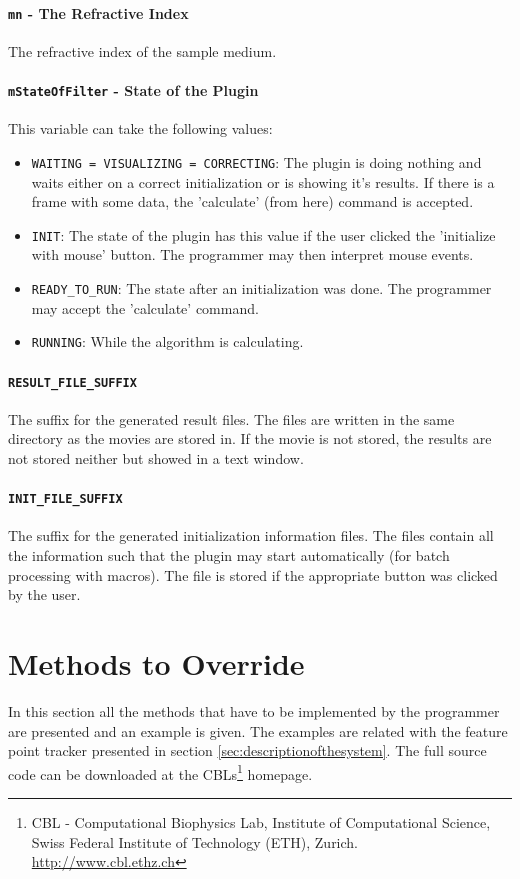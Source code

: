 \documentclass{scrartcl}
\begin{document}
\paragraph{\texttt{mn} - The Refractive Index} The refractive index of the sample medium.
\paragraph{\texttt{mStateOfFilter} - State of the Plugin} This variable can take the following values: 
\begin{itemize}
	\item \texttt{WAITING = VISUALIZING = CORRECTING}: The plugin is doing nothing and waits either on a correct initialization or is showing it's results. If there is a frame with some data, the 'calculate' (from here) command is accepted.
	\item \texttt{INIT}: The state of the plugin has this value if the user clicked the 'initialize with mouse' button. The programmer may then interpret mouse events.
	\item \texttt{READY\_TO\_RUN}: The state after an initialization was done. The programmer may accept the 'calculate' command.
	\item \texttt{RUNNING}: While the algorithm is calculating.
\end{itemize}
\paragraph{\texttt{RESULT\_FILE\_SUFFIX}} The suffix for the generated result files. The files are written in the same directory as the movies are stored in. If the movie is not stored, the results are not stored neither but showed in a text window.
\paragraph{\texttt{INIT\_FILE\_SUFFIX}} The suffix for the generated initialization information files. The files contain all the information such that the plugin may start automatically (for batch processing with macros). The file is stored if the appropriate button was clicked by the user.

\section{Methods to Override}
\label{sec:methodstooverride}
In this section all the methods that have to be implemented by the programmer are presented and an example is given. The examples are related with the feature point tracker presented in section \ref{sec:descriptionofthesystem}. The full source code can be downloaded at the CBLs\footnote{CBL - Computational Biophysics Lab, Institute of Computational Science, Swiss Federal Institute of Technology (ETH), Zurich. \href{http://www.cbl.ethz.ch}{http://www.cbl.ethz.ch}} homepage. 
\end{document}
